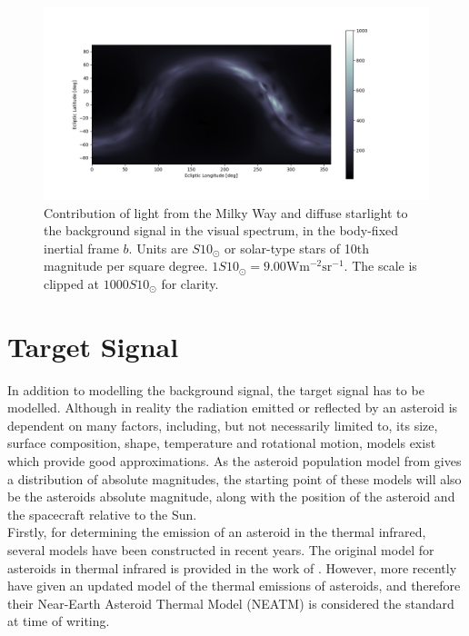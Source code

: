 \begin{figure}[htbp]
 \centering
 \includegraphics[width=1.0\textwidth]{img/background_vis_stars.png}
 \caption{Contribution of light from the Milky Way and diffuse starlight to the background signal in the visual spectrum, in the body-fixed inertial frame $b$. Units are $S10_\odot$ or solar-type stars of 10th magnitude per square degree. $1S10_\odot = 9.00\mathrm{W}\mathrm{m}^{-2}\mathrm{sr}^{-1}$. The scale is clipped at $1000 S10_\odot$ for clarity.}
 \label{fig:starsvisbackground}
\end{figure}


\section{Target Signal}
\label{sec:modelling_target}
In addition to modelling the background signal, the target signal has to be modelled. Although in reality the radiation emitted or reflected by an asteroid is dependent on many factors, including, but not necessarily limited to, its size, surface composition, shape, temperature and rotational motion, models exist which provide good approximations. As the asteroid population model from \cite{GranvikPopulation} gives a distribution of absolute magnitudes, the starting point of these models will also be the asteroids absolute magnitude, along with the position of the asteroid and the spacecraft relative to the Sun. \\

Firstly, for determining the emission of an asteroid in the thermal infrared, several models have been constructed in recent years. The original model for asteroids in thermal infrared is provided in the work of \cite{AsteroidSTM}. However, more recently \cite{AsteroidNEATM} have given an updated model of the thermal emissions of asteroids, and therefore their Near-Earth Asteroid Thermal Model (NEATM) is considered the standard at time of writing. \\

